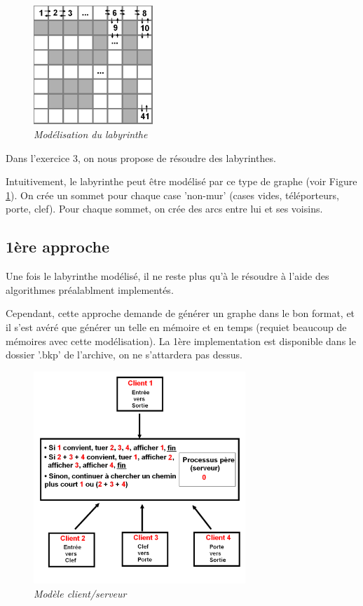 \documentclass[10pt]{article}
\begin{document}
		\begin{figure}
			\includegraphics[width=4.5cm]{./images/lab.png}
			\caption{\textit{Modélisation du labyrinthe}}
			\label{modelisationlab}
		\end{figure}
		
		Dans l'exercice 3, on nous propose de résoudre des labyrinthes.\newline
		
		Intuitivement, le labyrinthe peut être modélisé par ce type de graphe (voir Figure \ref{modelisationlab}).
		On crée un sommet pour chaque case 'non-mur' (cases vides, téléporteurs, porte, clef).
		Pour chaque sommet, on crée des arcs entre lui et ses voisins.\newline
			
		\subsection{1ère approche} \label{first_approach}
			Une fois le labyrinthe modélisé, il ne reste plus qu'à le résoudre à l'aide des algorithmes préalablment implementés.\newline
			
			Cependant, cette approche demande de générer un graphe dans le bon format, et il s'est avéré que générer un telle
			en mémoire et en temps (requiet beaucoup de mémoires avec cette modélisation).
			La 1ère implementation est disponible dans le dossier '.bkp' de l'archive, on ne s'attardera pas dessus.

		\begin{figure}
			\includegraphics[width=8.0cm]{./images/exo3.png}
			\caption{\textit{Modèle client/serveur}}
			\label{exo3}
		\end{figure}
\end{document}

